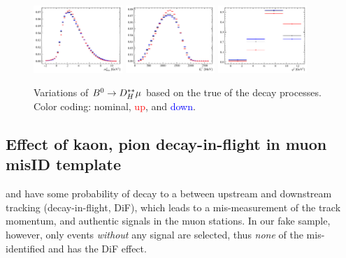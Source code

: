 \begin{figure}[!htb]
    \centering
    \includegraphics[width=0.3\textwidth]{./figs-fit-fit-variations/histo-var/D0_iso_DststHMuD0__vs__D0_iso_DststHMuD0_q2m__vs__D0_iso_DststHMuD0_q2p__m2miss.pdf}
    \includegraphics[width=0.3\textwidth]{./figs-fit-fit-variations/histo-var/D0_iso_DststHMuD0__vs__D0_iso_DststHMuD0_q2m__vs__D0_iso_DststHMuD0_q2p__el.pdf}
    \includegraphics[width=0.3\textwidth]{./figs-fit-fit-variations/histo-var/D0_iso_DststHMuD0__vs__D0_iso_DststHMuD0_q2m__vs__D0_iso_DststHMuD0_q2p__q2.pdf}

    \caption{
        Variations of ${{B}^0} \rightarrow D_H^{**}\mu$ based on the true
        \qSq of the decay processes.
        Color coding: nominal, \textcolor{red}{up}, and \textcolor{blue}{down}.
    }
    \label{fig:fit-variations:dstst-heavy}
\end{figure}


\subsection{Effect of kaon, pion decay-in-flight in muon misID template}
\label{ref:fit:var:misid-dif}

\kaon and \pion have some probability of decay to a \muon between upstream and
downstream tracking (decay-in-flight, DiF),
which leads to a mis-measurement of the track momentum,
and authentic signals in the muon stations.
In our fake \muon sample, however, only events \emph{without} any \muon
signal are selected, thus \emph{none} of the mis-identified \kaon and \pion has
the DiF effect.


